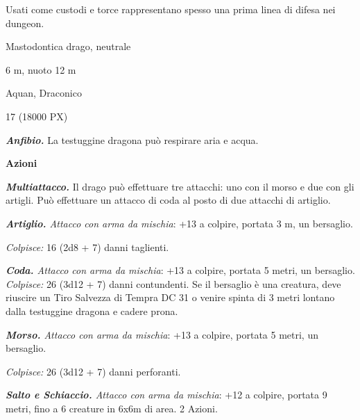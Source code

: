 \begin{multicols}{2}
{Usati come custodi e torce rappresentano spesso una prima linea di difesa nei dungeon.

\begin{description}[noitemsep, topsep=0pt, parsep=0pt, partopsep=0pt, itemsep=1pt, leftmargin=2.35cm,  labelwidth=2.2cm, itemindent=0cm, listparindent=0pt] %
\setlength{\baselineskip}{10pt}
\item[\textbf{Taglia/Tipo}] Mastodontica drago, neutrale
\item[\textbf{Caratt.}] 
\item[\textbf{Punti Ferita}] 
\item[\textbf{Movimento}] 6 m, nuoto 12 m
\item[\textbf{Tiri Salvez.}] 
\item[\textbf{Sensi}] 
\item[\textbf{Linguaggi}] Aquan, Draconico
\item[\textbf{Sfida}] 17 (18000 PX)
\end{description}
\smallskip

\emph{\textbf{Anfibio.}} La testuggine dragona può respirare aria e acqua.

\textbf{Azioni}

\emph{\textbf{Multiattacco.}} Il drago può effettuare tre attacchi: uno con il morso e due con gli artigli. Può effettuare un attacco di coda al posto di due attacchi di artiglio.

\emph{\textbf{Artiglio.} Attacco con arma da mischia}: +13 a colpire, portata 3 m, un bersaglio.

\emph{Colpisce:} 16 (2d8 + 7) danni taglienti.

\emph{\textbf{Coda.} Attacco con arma da mischia}: +13 a colpire, portata 5 metri, un bersaglio.
\emph{Colpisce:} 26 (3d12 + 7) danni contundenti. Se il bersaglio è una creatura, deve riuscire un Tiro Salvezza di Tempra DC 31 o venire spinta di 3 metri lontano dalla testuggine dragona e cadere prona.

\emph{\textbf{Morso.} Attacco con arma da mischia}: +13 a colpire, portata 5 metri, un bersaglio.

\emph{Colpisce:} 26 (3d12 + 7) danni perforanti.

\emph{\textbf{Salto e Schiaccio.} Attacco con arma da mischia}: +12 a colpire, portata 9 metri, fino a 6 creature in 6x6m di area. 2 Azioni.

}
\end{multicols}
